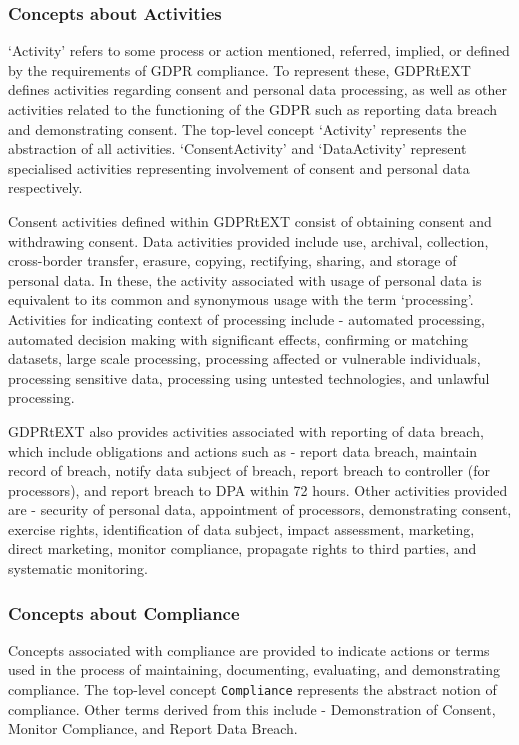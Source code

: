 \subsubsection{Concepts about Activities}
`Activity' refers to some process or action mentioned, referred, implied, or defined by the requirements of GDPR compliance. To represent these, GDPRtEXT defines activities regarding consent and personal data processing, as well as other activities related to the functioning of the GDPR such as reporting data breach and demonstrating consent. The top-level concept `Activity' represents the abstraction of all activities. `ConsentActivity' and `DataActivity' represent specialised activities representing involvement of consent and personal data respectively.

Consent activities defined within GDPRtEXT consist of obtaining consent and withdrawing consent. Data activities provided include use, archival, collection, cross-border transfer, erasure, copying, rectifying, sharing, and storage of personal data. In these, the activity associated with usage of personal data is equivalent to its common and synonymous usage with the term `processing'. Activities for indicating context of processing include - automated processing,  automated decision making with significant effects, confirming or matching datasets, large scale processing, processing affected or vulnerable individuals, processing sensitive data, processing using untested technologies, and unlawful processing.

GDPRtEXT also provides activities associated with reporting of data breach, which include obligations and actions such as - report data breach, maintain record of breach, notify data subject of breach, report breach to controller (for processors), and report breach to DPA within 72 hours. Other activities provided are - security of personal data, appointment of processors, demonstrating consent, exercise rights, identification of data subject, impact assessment, marketing, direct marketing, monitor compliance, propagate rights to third parties, and systematic monitoring.

\subsubsection{Concepts about Compliance}
Concepts associated with compliance are provided to indicate actions or terms used in the process of maintaining, documenting, evaluating, and demonstrating compliance. The top-level concept \texttt{Compliance} represents the abstract notion of compliance. Other terms derived from this include - Demonstration of Consent, Monitor Compliance, and Report Data Breach.

